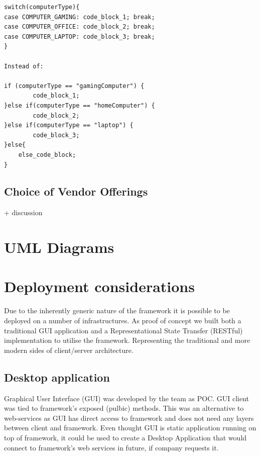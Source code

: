 \documentclass[pdftex,11pt,a4paper]{article}
\begin{document}
\begin{lstlisting}
switch(computerType){
case COMPUTER_GAMING: code_block_1; break;	
case COMPUTER_OFFICE: code_block_2; break;
case COMPUTER_LAPTOP: code_block_3; break;
}

Instead of:
	
if (computerType == "gamingComputer") {
		code_block_1;
}else if(computerType == "homeComputer") {
		code_block_2;
}else if(computerType == "laptop") {
		code_block_3;
}else{
	else_code_block;
}
\end{lstlisting}

\subsection{Choice of Vendor Offerings}

+ discussion

\pagebreak

\section{UML Diagrams}

\pagebreak

\section{Deployment considerations}
Due to the inherently generic nature of the framework it is possible to be deployed on a number of infrastructures. As proof of concept we built both a traditional GUI application and a Representational State Transfer (RESTful)\cite{REST} implementation to utilise the framework. Representing the traditional and more modern sides of client/server architecture.

\subsection{Desktop application}

Graphical User Interface (GUI) was developed by the team as POC. GUI client was tied to framework's exposed (pulbic) methods. This was an alternative to web-services as GUI has direct access to framework and does not need any layers between client and framework. Even thought GUI is static application running on top of framework, it could be used to create a Desktop Application that would connect to framework's web services in future, if company requests it.
\end{document}
